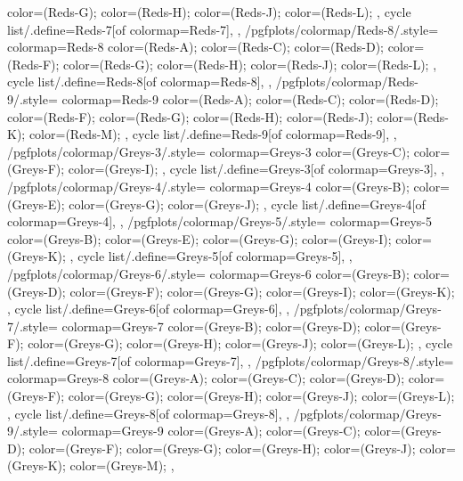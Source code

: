 {{{      color=(Reds-G);
      color=(Reds-H);
      color=(Reds-J);
      color=(Reds-L);
    },
    cycle list/.define={Reds-7}{[of colormap=Reds-7]},
  },
  /pgfplots/colormap/Reds-8/.style={
    colormap={Reds-8}{
      color=(Reds-A);
      color=(Reds-C);
      color=(Reds-D);
      color=(Reds-F);
      color=(Reds-G);
      color=(Reds-H);
      color=(Reds-J);
      color=(Reds-L);
    },
    cycle list/.define={Reds-8}{[of colormap=Reds-8]},
  },
  /pgfplots/colormap/Reds-9/.style={
    colormap={Reds-9}{
      color=(Reds-A);
      color=(Reds-C);
      color=(Reds-D);
      color=(Reds-F);
      color=(Reds-G);
      color=(Reds-H);
      color=(Reds-J);
      color=(Reds-K);
      color=(Reds-M);
    },
    cycle list/.define={Reds-9}{[of colormap=Reds-9]},
  },
  /pgfplots/colormap/Greys-3/.style={
    colormap={Greys-3}{
      color=(Greys-C);
      color=(Greys-F);
      color=(Greys-I);
    },
    cycle list/.define={Greys-3}{[of colormap=Greys-3]},
  },
  /pgfplots/colormap/Greys-4/.style={
    colormap={Greys-4}{
      color=(Greys-B);
      color=(Greys-E);
      color=(Greys-G);
      color=(Greys-J);
    },
    cycle list/.define={Greys-4}{[of colormap=Greys-4]},
  },
  /pgfplots/colormap/Greys-5/.style={
    colormap={Greys-5}{
      color=(Greys-B);
      color=(Greys-E);
      color=(Greys-G);
      color=(Greys-I);
      color=(Greys-K);
    },
    cycle list/.define={Greys-5}{[of colormap=Greys-5]},
  },
  /pgfplots/colormap/Greys-6/.style={
    colormap={Greys-6}{
      color=(Greys-B);
      color=(Greys-D);
      color=(Greys-F);
      color=(Greys-G);
      color=(Greys-I);
      color=(Greys-K);
    },
    cycle list/.define={Greys-6}{[of colormap=Greys-6]},
  },
  /pgfplots/colormap/Greys-7/.style={
    colormap={Greys-7}{
      color=(Greys-B);
      color=(Greys-D);
      color=(Greys-F);
      color=(Greys-G);
      color=(Greys-H);
      color=(Greys-J);
      color=(Greys-L);
    },
    cycle list/.define={Greys-7}{[of colormap=Greys-7]},
  },
  /pgfplots/colormap/Greys-8/.style={
    colormap={Greys-8}{
      color=(Greys-A);
      color=(Greys-C);
      color=(Greys-D);
      color=(Greys-F);
      color=(Greys-G);
      color=(Greys-H);
      color=(Greys-J);
      color=(Greys-L);
    },
    cycle list/.define={Greys-8}{[of colormap=Greys-8]},
  },
  /pgfplots/colormap/Greys-9/.style={
    colormap={Greys-9}{
      color=(Greys-A);
      color=(Greys-C);
      color=(Greys-D);
      color=(Greys-F);
      color=(Greys-G);
      color=(Greys-H);
      color=(Greys-J);
      color=(Greys-K);
      color=(Greys-M);
    },
}}

